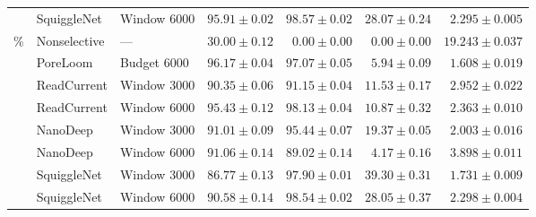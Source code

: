 \begin{tabular}{@{}lllrrrr@{}}
 & SquiggleNet & Window 6000 & $95.91 \pm 0.02$ & $98.57 \pm 0.02$ & $28.07 \pm 0.24$ & $2.295 \pm 0.005$\\
\addlinespace
30\% & Nonselective & --- & $30.00 \pm 0.12$ & $0.00 \pm 0.00$ & $0.00 \pm 0.00$ & $19.243 \pm 0.037$\\
 & PoreLoom & Budget 6000 & $96.17 \pm 0.04$ & $97.07 \pm 0.05$ & $5.94 \pm 0.09$ & $1.608 \pm 0.019$\\
 & ReadCurrent & Window 3000 & $90.35 \pm 0.06$ & $91.15 \pm 0.04$ & $11.53 \pm 0.17$ & $2.952 \pm 0.022$\\
 & ReadCurrent & Window 6000 & $95.43 \pm 0.12$ & $98.13 \pm 0.04$ & $10.87 \pm 0.32$ & $2.363 \pm 0.010$\\
 & NanoDeep & Window 3000 & $91.01 \pm 0.09$ & $95.44 \pm 0.07$ & $19.37 \pm 0.05$ & $2.003 \pm 0.016$\\
 & NanoDeep & Window 6000 & $91.06 \pm 0.14$ & $89.02 \pm 0.14$ & $4.17 \pm 0.16$ & $3.898 \pm 0.011$\\
 & SquiggleNet & Window 3000 & $86.77 \pm 0.13$ & $97.90 \pm 0.01$ & $39.30 \pm 0.31$ & $1.731 \pm 0.009$\\
 & SquiggleNet & Window 6000 & $90.58 \pm 0.14$ & $98.54 \pm 0.02$ & $28.05 \pm 0.37$ & $2.298 \pm 0.004$\\
\bottomrule
\end{tabular}
\endgroup
